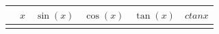 \documentclass{article}
\newcommand{\trigtable}{\directlua{trigtable()}}
\begin{document}
    \begin{tabular}{rccccc}
    \hline
    & $x$ & $\sin(x)$ & $\cos(x)$ & $\tan(x)$ & $ ctan{x}$ \\
    \hline
    \trigtable
    \hline
    \end{tabular}
\end{document}
